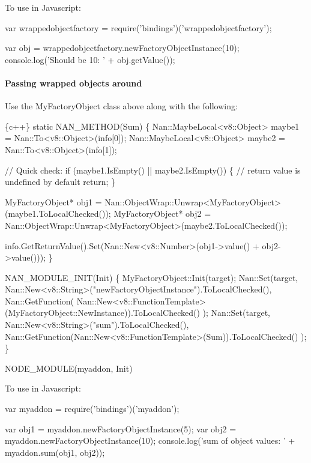 To use in Javascript\+:


\begin{DoxyCode}
var wrappedobjectfactory = require('bindings')('wrappedobjectfactory');

var obj = wrappedobjectfactory.newFactoryObjectInstance(10);
console.log('Should be 10: ' + obj.getValue());
\end{DoxyCode}


\paragraph*{Passing wrapped objects around}

Use the {\ttfamily My\+Factory\+Object} class above along with the following\+:


\begin{DoxyCode}
\{c++\}
static NAN\_METHOD(Sum) \{
  Nan::MaybeLocal<v8::Object> maybe1 = Nan::To<v8::Object>(info[0]);
  Nan::MaybeLocal<v8::Object> maybe2 = Nan::To<v8::Object>(info[1]);

  // Quick check:
  if (maybe1.IsEmpty() || maybe2.IsEmpty()) \{
    // return value is undefined by default
    return;
  \}

  MyFactoryObject* obj1 =
    Nan::ObjectWrap::Unwrap<MyFactoryObject>(maybe1.ToLocalChecked());
  MyFactoryObject* obj2 =
    Nan::ObjectWrap::Unwrap<MyFactoryObject>(maybe2.ToLocalChecked());

  info.GetReturnValue().Set(Nan::New<v8::Number>(obj1->value() + obj2->value()));
\}

NAN\_MODULE\_INIT(Init) \{
  MyFactoryObject::Init(target);
  Nan::Set(target,
    Nan::New<v8::String>("newFactoryObjectInstance").ToLocalChecked(),
    Nan::GetFunction(
      Nan::New<v8::FunctionTemplate>(MyFactoryObject::NewInstance)).ToLocalChecked()
  );
  Nan::Set(target,
    Nan::New<v8::String>("sum").ToLocalChecked(),
    Nan::GetFunction(Nan::New<v8::FunctionTemplate>(Sum)).ToLocalChecked()
  );
\}

NODE\_MODULE(myaddon, Init)
\end{DoxyCode}


To use in Javascript\+:


\begin{DoxyCode}
var myaddon = require('bindings')('myaddon');

var obj1 = myaddon.newFactoryObjectInstance(5);
var obj2 = myaddon.newFactoryObjectInstance(10);
console.log('sum of object values: ' + myaddon.sum(obj1, obj2));
\end{DoxyCode}
 